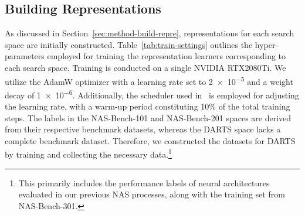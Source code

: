 \documentclass[../main.tex]{subfiles}
\begin{document}
\subsection{Building Representations}

As discussed in Section~\ref{sec:method-build-repre}, representations for each search space are initially constructed.
Table~\ref{tab:train-settings} outlines the hyper-parameters employed for training the representation learners corresponding to each search space.
Training is conducted on a single NVIDIA RTX2080Ti.
We utilize the AdamW optimizer with a learning rate set to \num{2e-5} and a weight decay of \num{1e-6}.
Additionally, the scheduler used in~\cite{DBLP:conf/nips/VaswaniSPUJGKP17} is employed for adjusting the learning rate, with a warm-up period constituting 10\% of the total training steps.
The labels in the NAS-Bench-101 and NAS-Bench-201 spaces are derived from their respective benchmark datasets, whereas the DARTS space lacks a complete benchmark dataset. Therefore, we constructed the datasets for DARTS by training and collecting the necessary data.\footnote{This primarily includes the performance labels of neural architectures evaluated in our previous NAS processes, along with the training set from NAS-Bench-301.}
\end{document}
